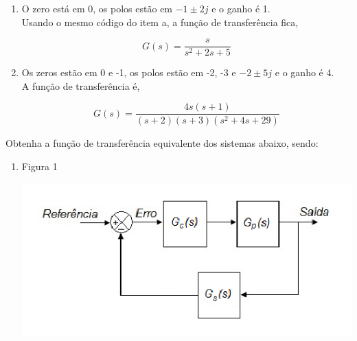 \documentclass[paper=a4, fontsize=11pt]{article}
\begin{document}
\begin{list}{\textbf{Questão .}}{
\setlength{\labelwidth}{-2mm} \setlength{\parsep}{0mm}
\setlength{\topsep}{0mm} \setlength{\leftmargin}{0mm}}
\begin{enumerate}
                Para a solução, o seguinte código foi utilizado,

                \begin{lstlisting}
z = [];
p = [-2+5j -2-5j];
k = 10;
zpk(z, p, k);               
                \end{lstlisting}

                Resultando na seguinte função de transferência,

                $$
                G(s) = \frac{10}{s^2 + 4 s + 29}
                $$



             \item
                 O zero está em 0, os polos estão em $-1\pm2j$ e o ganho é 1.\\

                 Usando o mesmo código do item a, a função de transferência fica,

                 $$
                 G(s) = \frac{s}{s^2 + 2 s + 5}
                 $$

                 

             \item
                 Os zeros estão em 0 e -1, os polos estão em -2, -3 e 
                 $-2\pm5j$ e o ganho é 4.\\

                 A função de transferência é,

                 $$
                 G(s) = \frac{4 s (s+1)}{(s+2) (s+3) (s^2 + 4 s + 29)}
                 $$
                

        \end{enumerate}



\newpage
\item
    Obtenha a função de transferência equivalente dos sistemas abaixo, sendo:

    \begin{enumerate}
        \item
            Figura 1
            \begin{center}
            \includegraphics[scale=0.5]{fig5a.png}
            \end{center}


\end{enumerate}
\end{list}
\end{document}
